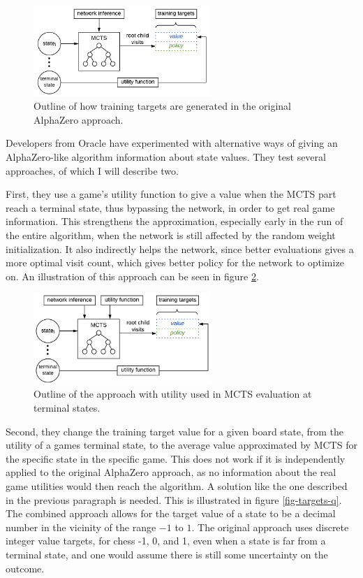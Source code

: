 \begin{figure}[ht]
	\centering
	\includegraphics[width=0.6\textwidth]{figures/training-targets-az}
	\caption{Outline of how training targets are generated in the original AlphaZero approach.}
	\label{fig-targets-az}
\end{figure}

Developers from Oracle have experimented with alternative ways of giving an AlphaZero-like algorithm information about state values\cite{Abrams2018}. They test several approaches, of which I will describe two.

First, they use a game's utility function to give a value when the MCTS part reach a terminal state, thus bypassing the network, in order to get real game information. This strengthens the approximation, especially early in the run of the entire algorithm, when the network is still affected by the random weight initialization. It also indirectly helps the network, since better evaluations gives a more optimal visit count, which gives better policy for the network to optimize on. An illustration of this approach can be seen in figure \ref{fig-targets-util}.

\begin{figure}[ht]
	\centering
	\includegraphics[width=0.6\textwidth]{figures/training-targets-util}
	\caption{Outline of the approach with utility used in MCTS evaluation at terminal states.}
	\label{fig-targets-util}
\end{figure}

Second, they change the training target value for a given board state, from the utility of a games terminal state, to the average value approximated by MCTS for the specific state in the specific game. This does not work if it is independently applied to the original AlphaZero approach, as no information about the real game utilities would then reach the algorithm. A solution like the one described in the previous paragraph is needed. This is illustrated in figure \ref{fig-targets-q}. The combined approach allows for the target value of a state to be a decimal number in the vicinity of the range $-1$ to $1$. The original approach uses discrete integer value targets, for chess -1, 0, and 1, even when a state is far from a terminal state, and one would assume there is still some uncertainty on the outcome.

